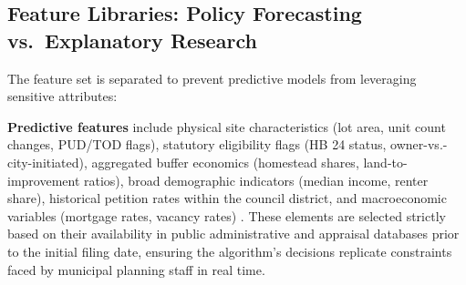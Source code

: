 \documentclass[11pt, letterpaper, oneside]{article}
\begin{document}
\begin{table}[htbp]
    \centering
    \caption[Exemplar State Protest Petition Thresholds]{Illustrative statutory parameters governing protest petitions across states detailed by Furth and McKinley \cite{furth2025protest}. While 21 states utilize similar architectures, the threshold mechanism and buffer stringency dictate the severity of the institutional veto.}
    \label{tab:state_thresholds}
\end{table}

\subsection{Feature Libraries: Policy Forecasting vs.\ Explanatory Research}

The feature set is separated to prevent predictive models from leveraging sensitive attributes:

\textbf{Predictive features} include physical site characteristics (lot area, unit count changes, PUD/TOD flags), statutory eligibility flags (HB 24 status, owner-vs.-city-initiated), aggregated buffer economics (homestead shares, land-to-improvement ratios), broad demographic indicators (median income, renter share), historical petition rates within the council district, and macroeconomic variables (mortgage rates, vacancy rates) \cite{fredmacro}. These elements are selected strictly based on their availability in public administrative and appraisal databases prior to the initial filing date, ensuring the algorithm's decisions replicate constraints faced by municipal planning staff in real time.
\end{document}
